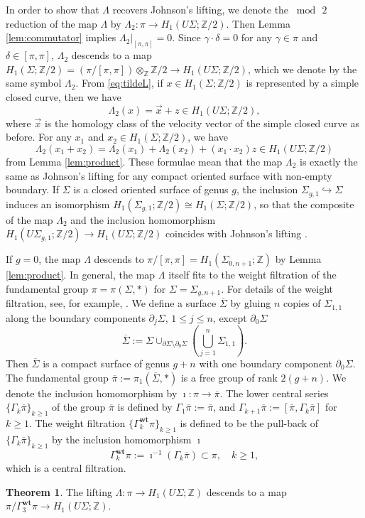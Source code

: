 \documentclass[a4paper,12pt, twoside]{amsart}
\theoremstyle{definition}
\newtheorem{thm}[dfn]{Theorem}
\theoremstyle{remark}
\numberwithin{equation}{section}
\newcommand\bZ{{\mathbb{Z}}}
\newcommand\Gwt{\Gamma^{\mathbf{wt}}}
\newcommand\inv{^{-1}}
\newcommand\La{\Lambda}
\newcommand\pa{\partial}
\begin{document}
In order to show that $\La$ recovers Johnson's lifting, 
we denote the $\bmod\,2$ reduction of the map $\La$ by $\La_2: \pi \to H_1(U\Sigma; \bZ/2)$. Then Lemma \ref{lem:commutator} implies $\La_2\vert_{[\pi, \pi]} = 0$. 
Since $\gamma\cdot\delta =0$ for any $\gamma \in \pi$ and $\delta \in [\pi, \pi]$, $\La_2$ descends to a map $H_1(\Sigma; \bZ/2) = (\pi/[\pi, \pi])\otimes_{\bZ}\bZ/2 \to H_1(U\Sigma; \bZ/2)$, which we denote by the same symbol $\La_2$. 
From \eqref{eq:tildeL}, if $x \in H_1(\Sigma; \bZ/2)$ is represented by a simple closed curve, then we have 
$$
\La_2(x) = \overrightarrow{x} + z \in H_1(U\Sigma; \bZ/2),
$$
where $\overrightarrow{x}$ is the homology class of the velocity vector of the simple closed curve as before. For any $x_1$ and $x_2 \in H_1(\Sigma; \bZ/2)$, we have 
$$
\La_2(x_1+x_2) = \La_2(x_1) + \La_2(x_2) + (x_1\cdot x_2)z \in H_1(U\Sigma; \bZ/2)
$$
from Lemma \ref{lem:product}. These formulae mean that the map $\La_2$ is exactly the same as Johnson's lifting for any compact oriented surface with non-empty boundary.
If $\Sigma$ is a closed oriented surface of genus $g$, the inclusion $\Sigma_{g,1} \hookrightarrow \Sigma$ induces an isomorphism $H_1(\Sigma_{g,1}; \bZ/2) \cong H_1(\Sigma; \bZ/2)$, so that the composite of the map $\La_2$ and the inclusion homomorphism \\
$H_1(U\Sigma_{g,1}; \bZ/2) \to H_1(U\Sigma; \bZ/2)$ coincides with Johnson's lifting \cite{J80a}. \par
\bigskip
If $g = 0$, the map $\La$ descends to $\pi/[\pi, \pi] = H_1(\Sigma_{0,n+1}; \bZ)$ by Lemma \ref{lem:product}. In general, the map $\La$ itself fits to the weight filtration of the fundamental group $\pi = \pi(\Sigma, \ast)$ for $\Sigma = \Sigma_{g,n+1}$. For details of the weight filtration, see, for example, \cite[\S\S 2.6, 3.1 and 3.2]{AKKNb}. 
We define a surface $\overline{\Sigma}$ by gluing $n$ copies of $\Sigma_{1,1}$ along the boundary components $\pa_j\Sigma$,  $1 \leq j \leq n$, except $\pa_0\Sigma$
$$
\overline{\Sigma} := \Sigma \cup_{\pa\Sigma\setminus \pa_0\Sigma}\left({\bigcup}^n_{j=1}\Sigma_{1,1}\right).
$$
Then $\overline{\Sigma}$ is a compact surface of genus $g+n$ with one boundary component $\pa_0\Sigma$. The fundamental group $\overline{\pi} := \pi_1(\overline{\Sigma}, \ast)$ is a free group of rank $2(g+n)$. We denote the inclusion homomorphism by $\imath: \pi \to \overline{\pi}$. 
The lower central series $\{\Gamma_k\overline{\pi}\}_{k\geq 1}$ of the group $\overline{\pi}$ is defined by $\Gamma_1\overline{\pi} := \overline{\pi}$, and $\Gamma_{k+1}\overline{\pi} := [\overline{\pi}, \Gamma_{k}\overline{\pi}]$ for $k \geq 1$. 
The weight filtration $\{\Gwt_k\pi\}_{k\geq 1}$ is defined to be the pull-back of $\{\Gamma_k\overline{\pi}\}_{k\geq 1}$ by the inclusion homomorphism $\imath$
$$
\Gwt_k\pi := \imath\inv(\Gamma_k\overline{\pi}) \subset \pi, \quad k \geq 1,
$$
which is a central filtration. \par
\begin{thm}\label{thm:wtG} The lifting $\La: \pi \to H_1(U\Sigma; \bZ)$ descends to a map $\pi/\Gwt_3\pi \to H_1(U\Sigma; \bZ)$. 
\end{thm}
\end{document}
